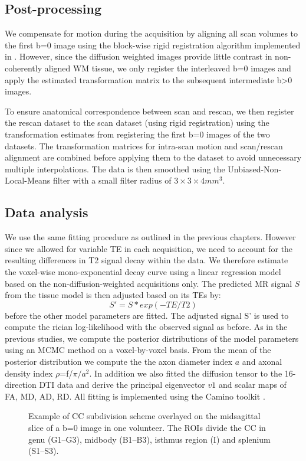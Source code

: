 \subsection{Post-processing}
We compensate for motion during the acquisition by aligning all scan volumes to the first b=0 image using the block-wise rigid registration algorithm \citep{Ourselin:2001} implemented in \citep{Modat:2010}. However, since the diffusion weighted images provide little contrast in non-coherently aligned WM tissue, we only register the interleaved b=0 images and apply the estimated transformation matrix to the subsequent intermediate b>0 images.   

To ensure anatomical correspondence between scan and rescan, we then register the rescan dataset to the scan dataset (using rigid registration) using the transformation estimates from registering  the first b=0 images of the two datasets. The transformation matrices for intra-scan motion and scan/rescan alignment are combined before applying them to the dataset to avoid unnecessary multiple interpolations. The data is then smoothed using the Unbiased-Non-Local-Means filter \citep{Tristan-Vega:2012} with a small filter radius of $3\times3\times4 mm^3$.

\subsection{Data analysis}
We use the same fitting procedure as outlined in the previous chapters. However since we allowed for variable TE in each acquisition, we need to account for the resulting differences in T2 signal decay within the data. We therefore estimate the voxel-wise mono-exponential decay curve using a linear regression model based on the non-diffusion-weighted acquisitions only. The predicted MR signal $S$ from the tissue model is then adjusted based on its \glspl{TE} by:
\begin{equation}
	S' = S * exp(-TE/T2)
\end{equation}
before the other model parameters are fitted. The adjusted signal S' is used to compute the rician log-likelihood with the observed signal as before. As in the previous studies, we compute the posterior distributions of the model parameters using an MCMC method on a voxel-by-voxel basis. From the mean of the posterior distribution we compute the the axon diameter index $a$ and axonal density index $\rho$=f/$\pi/a^2$. In addition we also fitted the diffusion tensor to the 16-direction DTI data and derive the principal eigenvector $v1$ and scalar maps of FA, MD, AD, RD. All fitting is implemented using the Camino toolkit \citep{Cook:2006}.
\begin{figure}[ht]
	\centering
	\caption{Example of CC subdivision scheme overlayed on the midsagittal slice of a b=0 image in one volunteer. The ROIs divide the CC in genu (G1--G3), midbody (B1--B3), isthmus region (I) and splenium (S1--S3).}
	\label{fig:chap9 CC ROIs}
\end{figure}

